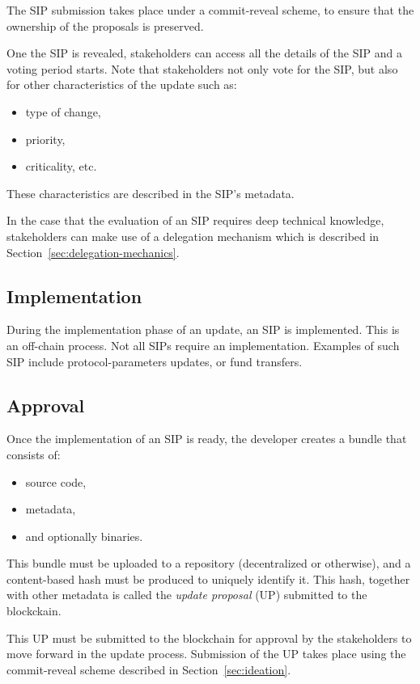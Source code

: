 \documentclass[11pt,a4paper]{article}
\begin{document}
The SIP submission takes place under a commit-reveal scheme, to ensure that the
ownership of the proposals is preserved.
%
%

One the SIP is revealed, stakeholders can access all the details of the SIP and
a voting period starts. Note that stakeholders not only vote for the SIP, but
also for other characteristics of the update such as:
\begin{itemize}
\item type of change,
\item priority,
\item criticality, etc.
\end{itemize}
These characteristics are described in the SIP's metadata.

In the case that the evaluation of an SIP requires deep technical knowledge,
stakeholders can make use of a delegation mechanism which is described in
Section~\ref{sec:delegation-mechanics}.

\subsection{Implementation}
\label{sec:implementation}

During the implementation phase of an update, an SIP is implemented. This is an
off-chain process. Not all SIPs require an implementation. Examples of such SIP
include protocol-parameters updates, or fund transfers.

\subsection{Approval}
\label{sec:approval}

Once the implementation of an SIP is ready, the developer creates a bundle that
consists of:
\begin{itemize}
\item source code,
\item metadata,
\item and optionally binaries.
\end{itemize}
This bundle must be uploaded to a repository (decentralized or otherwise), and a
content-based hash must be produced to uniquely identify it. This hash, together
with other metadata is called the \emph{update proposal} (UP)
submitted to the blockckain.

This UP must be submitted to the blockchain for approval by the stakeholders to
move forward in the update process. Submission of the UP takes place using the
commit-reveal scheme described in Section~\ref{sec:ideation}.
\end{document}

